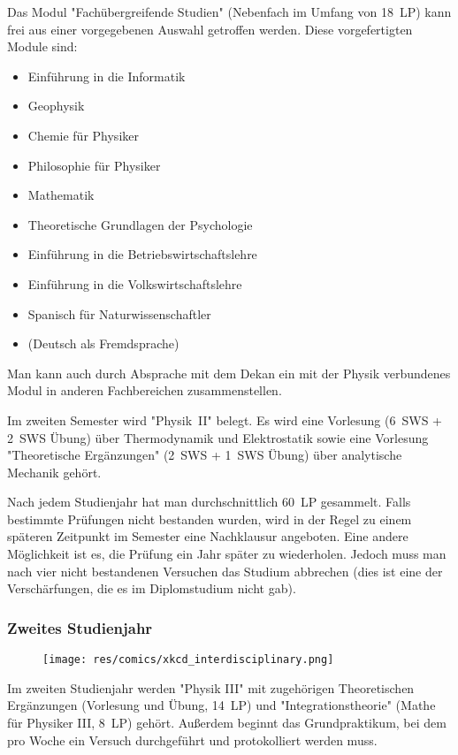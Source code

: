 \begin{multicols}{2}
\newpage

Das Modul "Fachübergreifende Studien" (Nebenfach im Umfang von \SI{18}{LP}) kann frei aus einer vorgegebenen Auswahl getroffen werden. Diese vorgefertigten Module sind:
\begin{itemize}[parsep=0.2cm]
\item Einführung in die Informatik
\item Geophysik
\item Chemie für Physiker
\item Philosophie für Physiker
\item Mathematik
\item Theoretische Grundlagen der Psychologie
\item Einführung in die Betriebswirtschaftslehre
\item Einführung in die Volkswirtschaftslehre
\item Spanisch für Naturwissenschaftler
\item (Deutsch als Fremdsprache)
\end{itemize}
Man kann auch durch Absprache mit dem Dekan ein mit der Physik verbundenes Modul in anderen Fachbereichen zusammenstellen.

Im zweiten Semester wird "Physik~II" belegt. Es wird eine Vorlesung (\SI{6}{SWS} + \SI{2}{SWS} Übung) über Thermodynamik und Elektrostatik sowie eine Vorlesung "Theoretische Ergänzungen" (\SI{2}{SWS} + \SI{1}{SWS} Übung) über analytische Mechanik gehört.

Nach jedem Studienjahr hat man durchschnittlich \SI{60}{LP} gesammelt. Falls bestimmte Prüfungen nicht bestanden wurden, wird in der Regel zu einem späteren Zeitpunkt im Semester eine Nachklausur angeboten. Eine andere Möglichkeit ist es, die Prüfung ein Jahr später zu wiederholen. Jedoch muss man nach vier nicht bestandenen Versuchen das Studium abbrechen (dies ist eine der Verschärfungen, die es im Diplomstudium nicht gab).
\subsubsection*{Zweites Studienjahr}
\setlength{\intextsep}{0.1cm}
\begin{wrapfigure}[10]{r}[0.5cm]{0cm}
\texttt{[image: res/comics/xkcd\_interdisciplinary.png]}
\vspace{0.1cm}
\end{wrapfigure}
Im zweiten Studienjahr werden "Physik III" mit zugehörigen Theoretischen Ergänzungen (Vorlesung und Übung, \SI{14}{LP}) und "Integrationstheorie" (Mathe für Physiker III, \SI{8}{LP}) gehört. Außerdem beginnt das Grundpraktikum, bei dem pro Woche ein Versuch durchgeführt und protokolliert werden muss.


\end{multicols}
